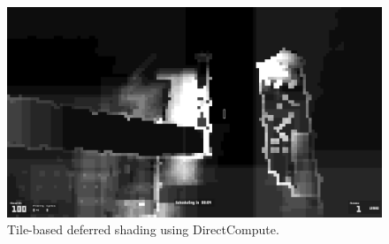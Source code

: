 \begin{frame}
\begin{figure}[ht]
  \begin{minipage}[b]{0.3\linewidth}
    \centering
    \includegraphics[width=1.0\textwidth]{img/tbds3.png}
  \end{minipage}
  \label{fig:tilingvisualization}
  \caption{Tile-based deferred shading using DirectCompute.}
\end{figure}


\end{frame}
